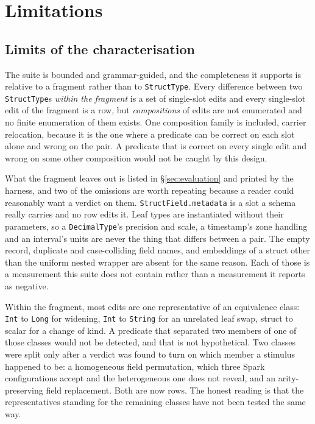 \section{Limitations}

\subsection{Limits of the characterisation}
\label{sec:limitations-characterisation}

The suite is bounded and grammar-guided, and the completeness it supports is relative to a fragment rather than to \texttt{StructType}. Every difference between two \texttt{StructType}s \emph{within the fragment} is a set of single-slot edits and every single-slot edit of the fragment is a row, but \emph{compositions} of edits are not enumerated and no finite enumeration of them exists. One composition family is included, carrier relocation, because it is the one where a predicate can be correct on each slot alone and wrong on the pair. A predicate that is correct on every single edit and wrong on some other composition would not be caught by this design.

What the fragment leaves out is listed in \S\ref{sec:evaluation} and printed by the harness, and two of the omissions are worth repeating because a reader could reasonably want a verdict on them. \texttt{StructField.metadata} is a slot a schema really carries and no row edits it. Leaf types are instantiated without their parameters, so a \texttt{DecimalType}'s precision and scale, a timestamp's zone handling and an interval's units are never the thing that differs between a pair. The empty record, duplicate and case-colliding field names, and embeddings of a struct other than the uniform nested wrapper are absent for the same reason. Each of those is a measurement this suite does not contain rather than a measurement it reports as negative.

Within the fragment, most edits are one representative of an equivalence class: \texttt{Int} to \texttt{Long} for widening, \texttt{Int} to \texttt{String} for an unrelated leaf swap, struct to scalar for a change of kind. A predicate that separated two members of one of those classes would not be detected, and that is not hypothetical. Two classes were split only after a verdict was found to turn on which member a stimulus happened to be: a homogeneous field permutation, which three Spark configurations accept and the heterogeneous one does not reveal, and an arity-preserving field replacement. Both are now rows. The honest reading is that the representatives standing for the remaining classes have not been tested the same way.

